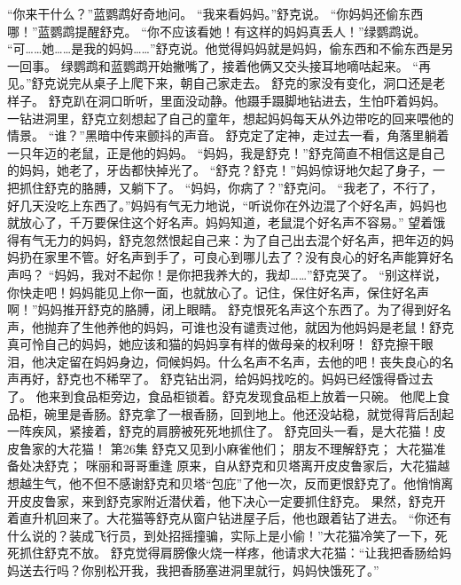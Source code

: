 \documentclass[a4paper,12pt,UTF8,twoside]{ctexbook}
\begin{document}
        “你来干什么？”蓝鹦鹉好奇地问。 
        “我来看妈妈。”舒克说。 
        “你妈妈还偷东西哪！”蓝鹦鹉提醒舒克。 
        “你不应该看她！有这样的妈妈真丢人！”绿鹦鹉说。 
        “可……她……是我的妈妈……”舒克说。他觉得妈妈就是妈妈，偷东西和不偷东西是另一回事。 
        绿鹦鹉和蓝鹦鹉开始撇嘴了，接着他俩又交头接耳地嘀咕起来。 
        “再见。”舒克说完从桌子上爬下来，朝自己家走去。 
        舒克的家没有变化，洞口还是老样子。 
        舒克趴在洞口昕听，里面没动静。他蹑手蹑脚地钻进去，生怕吓着妈妈。 
        一钻进洞里，舒克立刻想起了自己的童年，想起妈妈每天从外边带吃的回来喂他的情景。 
        “谁？”黑暗中传来颤抖的声音。 
        舒克定了定神，走过去一看，角落里躺着一只年迈的老鼠，正是他的妈妈。 
        “妈妈，我是舒克！”舒克简直不相信这是自己的妈妈，她老了，牙齿都快掉光了。 
        “舒克？舒克！”妈妈惊讶地欠起了身子，一把抓住舒克的胳膊，又躺下了。 
        “妈妈，你病了？”舒克问。 
        “我老了，不行了，好几天没吃上东西了。”妈妈有气无力地说，“听说你在外边混了个好名声，妈妈也就放心了，千万要保住这个好名声。妈妈知道，老鼠混个好名声不容易。” 
        望着饿得有气无力的妈妈，舒克忽然恨起自己来：为了自己出去混个好名声，把年迈的妈妈扔在家里不管。好名声到手了，可良心到哪儿去了？没有良心的好名声能算好名声吗？ 
        “妈妈，我对不起你！是你把我养大的，我却……”舒克哭了。 
        “别这样说，你快走吧！妈妈能见上你一面，也就放心了。记住，保住好名声，保住好名声啊！”妈妈推开舒克的胳膊，闭上眼睛。 
        舒克恨死名声这个东西了。为了得到好名声，他抛弃了生他养他的妈妈，可谁也没有谴责过他，就因为他妈妈是老鼠！舒克真可怜自己的妈妈，她应该和猫的妈妈享有样的做母亲的权利呀！ 
        舒克擦干眼泪，他决定留在妈妈身边，伺候妈妈。什么名声不名声，去他的吧！丧失良心的名声再好，舒克也不稀罕了。 
        舒克钻出洞，给妈妈找吃的。妈妈已经饿得昏过去了。 
        他来到食品柜旁边，食品柜锁着。舒克发现食品柜上放着一只碗。 
        他爬上食品柜，碗里是香肠。舒克拿了一根香肠，回到地上。他还没站稳，就觉得背后刮起一阵疾风，紧接着，舒克的肩膀被死死地抓住了。 
        舒克回头一看，是大花猫！皮皮鲁家的大花猫！   第26集 
        舒克又见到小麻雀他们； 
        朋友不理解舒克； 
        大花猫准备处决舒克； 
        咪丽和哥哥重逢   
        原来，自从舒克和贝塔离开皮皮鲁家后，大花猫越想越生气，他不但不感谢舒克和贝塔“包庇”了他一次，反而更恨舒克了。他悄悄离开皮皮鲁家，来到舒克家附近潜伏着，他下决心一定要抓住舒克。 
        果然，舒克开着直升机回来了。大花猫等舒克从窗户钻进屋子后，他也跟着钻了进去。 
        “你还有什么说的？装成飞行员，到处招摇撞骗，实际上是小偷！”大花猫冷笑了一下，死死抓住舒克不放。 
        舒克觉得肩膀像火烧一样疼，他请求大花猫：“让我把香肠给妈妈送去行吗？你别松开我，我把香肠塞进洞里就行，妈妈快饿死了。” 
\end{document}
